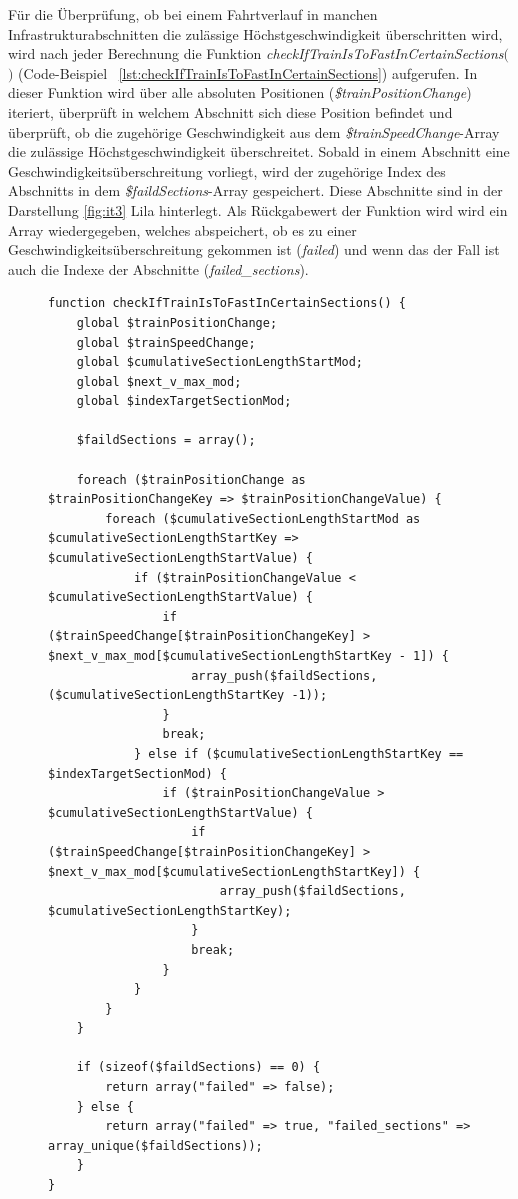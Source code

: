 Für die Überprüfung, ob bei einem Fahrtverlauf in manchen Infrastrukturabschnitten die zulässige Höchstgeschwindigkeit überschritten wird, wird nach jeder Berechnung die Funktion \textit{checkIfTrainIsToFastInCertainSections$($$)$} (Code-Beispiel ~\ref{lst:checkIfTrainIsToFastInCertainSections}) aufgerufen. In dieser Funktion wird über alle absoluten Positionen (\textit{\$trainPositionChange}) iteriert, überprüft in welchem Abschnitt sich diese Position befindet und überprüft, ob die zugehörige Geschwindigkeit aus dem \textit{\$trainSpeedChange}-Array die zulässige Höchstgeschwindigkeit überschreitet. Sobald in einem Abschnitt eine Geschwindigkeitsüberschreitung vorliegt, wird der zugehörige Index des Abschnitts in dem \textit{\$faildSections}-Array gespeichert. Diese Abschnitte sind in der Darstellung \ref{fig:it3} Lila hinterlegt. Als Rückgabewert der Funktion wird wird ein Array wiedergegeben, welches abspeichert, ob es zu einer Geschwindigkeitsüberschreitung gekommen ist (\textit{\grqq{}failed\grqq{}}) und wenn das der Fall ist auch die Indexe der Abschnitte (\textit{\grqq{}failed\_sections\grqq{}}).

\begin{figure}
\begin{lstlisting}[caption={\textit{checkIfTrainIsToFastInCertainSections$($$)$}},captionpos=b,label={lst:checkIfTrainIsToFastInCertainSections}]
function checkIfTrainIsToFastInCertainSections() {
	global $trainPositionChange;
	global $trainSpeedChange;
	global $cumulativeSectionLengthStartMod;
	global $next_v_max_mod;
	global $indexTargetSectionMod;

	$faildSections = array();

	foreach ($trainPositionChange as $trainPositionChangeKey => $trainPositionChangeValue) {
		foreach ($cumulativeSectionLengthStartMod as $cumulativeSectionLengthStartKey => $cumulativeSectionLengthStartValue) {
			if ($trainPositionChangeValue < $cumulativeSectionLengthStartValue) {
				if ($trainSpeedChange[$trainPositionChangeKey] > $next_v_max_mod[$cumulativeSectionLengthStartKey - 1]) {
					array_push($faildSections, ($cumulativeSectionLengthStartKey -1));
				}
				break;
			} else if ($cumulativeSectionLengthStartKey == $indexTargetSectionMod) {
				if ($trainPositionChangeValue > $cumulativeSectionLengthStartValue) {
					if ($trainSpeedChange[$trainPositionChangeKey] > $next_v_max_mod[$cumulativeSectionLengthStartKey]) {
						array_push($faildSections, $cumulativeSectionLengthStartKey);
					}
					break;
				}
			}
		}
	}

	if (sizeof($faildSections) == 0) {
		return array("failed" => false);
	} else {
		return array("failed" => true, "failed_sections" => array_unique($faildSections));
	}
}
\end{lstlisting}
\end{figure}

